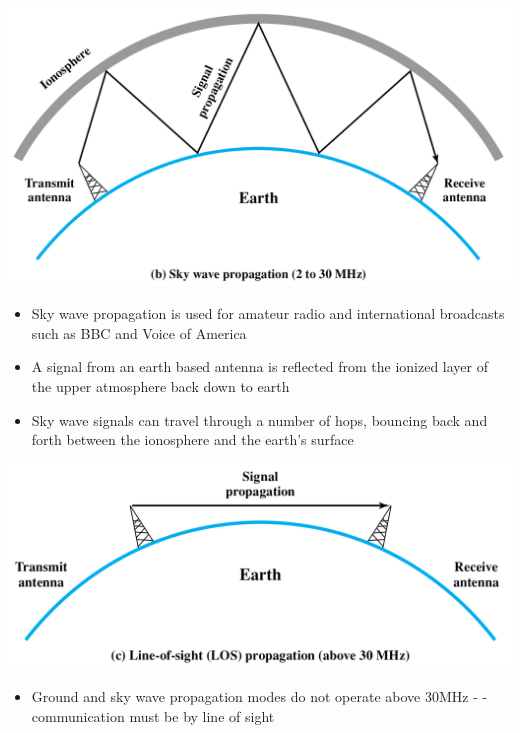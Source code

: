 \documentclass[pdflatex,compress]{beamer}
\begin{document}
\begin{frame}
	\begin{center}
		\includegraphics[height=0.4\textheight]{img/img24}
	\end{center}
	\begin{itemize}
		\item Sky wave propagation is used for amateur radio and international broadcasts such as BBC and Voice of America
		\item A signal from an earth based antenna is reflected from the ionized layer of the upper atmosphere back down to earth
		\item Sky wave signals can travel through a number of hops, bouncing back and forth between the ionosphere and the earth's surface
	\end{itemize}
\end{frame}

\begin{frame}
	\begin{center}
		\includegraphics[height=0.4\textheight]{img/img25}
	\end{center}
	\begin{itemize}
		\item Ground and sky wave propagation modes do not operate above 30MHz - - communication must be by line of sight
	\end{itemize}
\end{frame}
\end{document}
